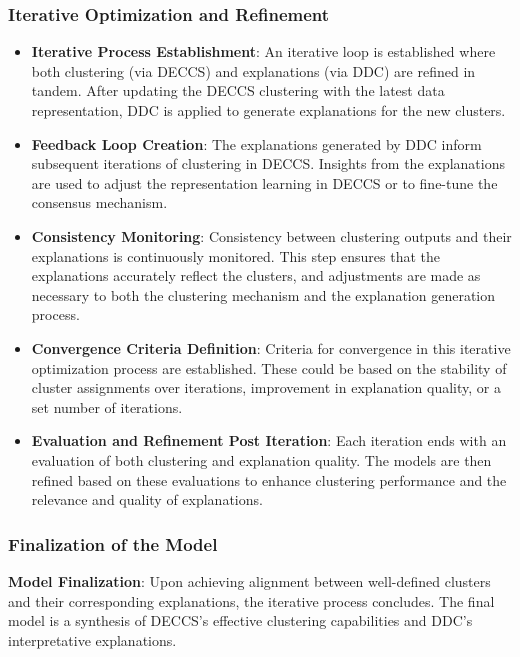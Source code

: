 \subsubsection{Iterative Optimization and Refinement}
\begin{itemize}
\item \textbf{Iterative Process Establishment}: An iterative loop is established where both clustering (via DECCS) and explanations (via DDC) are refined in tandem. After updating the DECCS clustering with the latest data representation, DDC is applied to generate explanations for the new clusters.

\item \textbf{Feedback Loop Creation}: The explanations generated by DDC inform subsequent iterations of clustering in DECCS. Insights from the explanations are used to adjust the representation learning in DECCS or to fine-tune the consensus mechanism.

\item \textbf{Consistency Monitoring}: Consistency between clustering outputs and their explanations is continuously monitored. This step ensures that the explanations accurately reflect the clusters, and adjustments are made as necessary to both the clustering mechanism and the explanation generation process.

\item \textbf{Convergence Criteria Definition}: Criteria for convergence in this iterative optimization process are established. These could be based on the stability of cluster assignments over iterations, improvement in explanation quality, or a set number of iterations.

\item \textbf{Evaluation and Refinement Post Iteration}: Each iteration ends with an evaluation of both clustering and explanation quality. The models are then refined based on these evaluations to enhance clustering performance and the relevance and quality of explanations.
\end{itemize}


\subsubsection{Finalization of the Model}
\textbf{Model Finalization}: Upon achieving alignment between well-defined clusters and their corresponding explanations, the iterative process concludes. The final model is a synthesis of DECCS’s effective clustering capabilities and DDC’s interpretative explanations.

